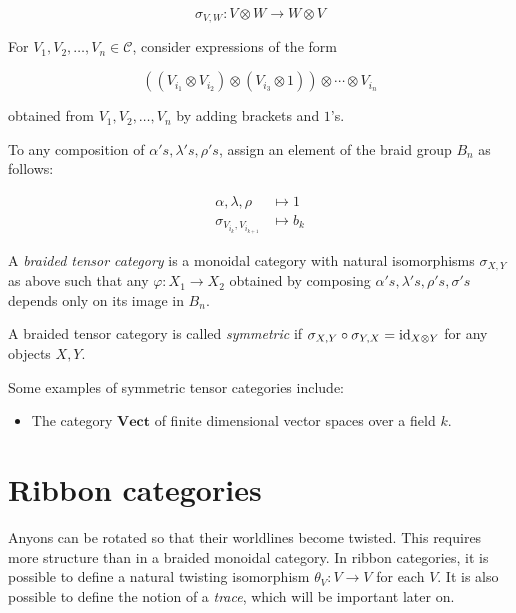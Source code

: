 \begin{equation}
    \sigma_{V,W} : V \otimes W \to W \otimes V
\end{equation}

For $V_1, V_2, \dots, V_n \in \mathcal{C}$, consider expressions of the form 

\begin{equation}
    ((V_{i_1}\otimes V_{i_2}) \otimes (V_{i_3} \otimes 1)) \otimes \cdots \otimes V_{i_n}
\end{equation}

obtained from $V_1,V_2,\ldots,V_n$ by adding brackets and $1$'s.

To any composition of $\alpha's, \lambda's, \rho's$, assign an element of the
braid group $B_n$ as follows:

\begin{align}
    \alpha, \lambda, \rho &\mapsto 1 \\
    \sigma_{V_{i_k}, V_{i_{k+1}}} &\mapsto b_k
\end{align}

\begin{defn}
    A \emph{braided tensor category} is a monoidal category with natural
    isomorphisms $\sigma_{X,Y}$ as above such that any $\varphi: X_1 \to X_2$
    obtained by composing $\alpha's, \lambda's, \rho's, \sigma's$ depends only
    on its image in $B_n$.
\end{defn}

\begin{defn}
    A braided tensor category is called \emph{symmetric} if $\sigma_{X,Y} \circ
    \sigma_{Y,X} = \operatorname{id}_{X \otimes Y}$ for any objects $X,Y$.
\end{defn}

Some examples of symmetric tensor categories include:

\begin{itemize}
    \item The category $\mathbf{Vect}$ of finite dimensional vector spaces over a field $k$.
\end{itemize}

\section{Ribbon categories}
\label{section:RibbonCategories}

Anyons can be rotated so that their worldlines become twisted. This requires
more structure than in a braided monoidal category.  In ribbon categories, it
is possible to define a natural twisting isomorphism $\theta_V: V\to V$ for
each $V$. It is also possible to define the notion of a \emph{trace}, which
will be important later on.

